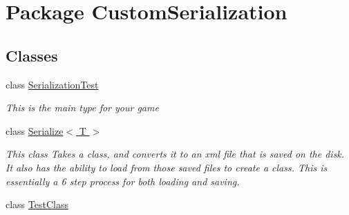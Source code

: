 \hypertarget{namespace_custom_serialization}{\section{Package Custom\-Serialization}
\label{db/d43/namespace_custom_serialization}
}
\subsection*{Classes}
\begin{DoxyCompactItemize}
\item 
class \hyperlink{class_custom_serialization_1_1_serialization_test}{Serialization\-Test}
\begin{DoxyCompactList}\small\item\em This is the main type for your game \end{DoxyCompactList}\item 
class \hyperlink{class_custom_serialization_1_1_serialize_3_01_t_01_4}{Serialize$<$ T $>$}
\begin{DoxyCompactList}\small\item\em This class Takes a class, and converts it to an xml file that is saved on the disk. It also has the ability to load from those saved files to create a class. This is essentially a 6 step process for both loading and saving. \end{DoxyCompactList}\item 
class \hyperlink{class_custom_serialization_1_1_test_class}{Test\-Class}
\end{DoxyCompactItemize}
